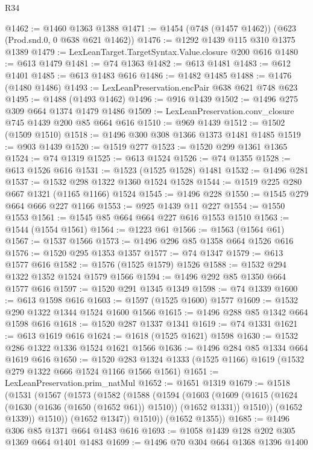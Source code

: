 \begin{lexlean}{R34}
\begin{coremodule}
@1462 := @1460 @1363 @1388
@1471 := @1454 (@748 (@1457 @1462)) (@623 (Prod.snd.{0, 0} @638 @621 @1462))
@1476 := @1292 @1439 @115 @310 @1375 @1389
@1479 := LexLeanTarget.TargetSyntax.Value.closure @200 @616
@1480 := @613 @1479
@1481 := @74 @1363
@1482 := @613 @1481
@1483 := @612 @1401
@1485 := @613 @1483 @616
@1486 := @1482 @1485
@1488 := @1476 (@1480 @1486)
@1493 := LexLeanPreservation.encPair @638 @621 @748 @623
@1495 := @1488 (@1493 @1462)
@1496 := @916 @1439
@1502 := @1496 @275 @309 @664 @1374 @1479 @1486
@1509 := LexLeanPreservation.conv_closure @745 @1439 @200 @85 @664 @616
@1510 := @969 @1439
@1512 := @1502 (@1509 @1510)
@1518 := @1496 @300 @308 @1366 @1373 @1481 @1485
@1519 := @903 @1439
@1520 := @1519 @277
@1523 := @1520 @299 @1361 @1365
@1524 := @74 @1319
@1525 := @613 @1524
@1526 := @74 @1355
@1528 := @613 @1526 @616
@1531 := @1523 (@1525 @1528) @1481
@1532 := @1496 @281
@1537 := @1532 @298 @1322 @1360 @1524 @1528
@1544 := @1519 @225 @280 @667 @1321 (@1165 @1166) @1524
@1545 := @1496 @228
@1550 := @1545 @279 @664 @666 @227 @1166
@1553 := @925 @1439 @11 @227
@1554 := @1550 @1553
@1561 := @1545 @85 @664 @664 @227 @616 @1553 @1510
@1563 := @1544 (@1554 @1561)
@1564 := @1223 @61
@1566 := @1563 (@1564 @61)
@1567 := @1537 @1566
@1573 := @1496 @296 @85 @1358 @664 @1526 @616
@1576 := @1520 @295 @1353 @1357
@1577 := @74 @1347
@1579 := @613 @1577 @616
@1582 := @1576 (@1525 @1579) @1526
@1588 := @1532 @294 @1322 @1352 @1524 @1579 @1566
@1594 := @1496 @292 @85 @1350 @664 @1577 @616
@1597 := @1520 @291 @1345 @1349
@1598 := @74 @1339
@1600 := @613 @1598 @616
@1603 := @1597 (@1525 @1600) @1577
@1609 := @1532 @290 @1322 @1344 @1524 @1600 @1566
@1615 := @1496 @288 @85 @1342 @664 @1598 @616
@1618 := @1520 @287 @1337 @1341
@1619 := @74 @1331
@1621 := @613 @1619 @616
@1624 := @1618 (@1525 @1621) @1598
@1630 := @1532 @286 @1322 @1336 @1524 @1621 @1566
@1636 := @1496 @284 @85 @1334 @664 @1619 @616
@1650 := @1520 @283 @1324 @1333 (@1525 @1166) @1619 (@1532 @279 @1322 @666 @1524 @1166 @1566 @1561)
@1651 := LexLeanPreservation.prim_natMul
@1652 := @1651 @1319
@1679 := @1518
    (@1531
      (@1567
        (@1573
          (@1582
            (@1588
              (@1594
                (@1603
                  (@1609
                    (@1615 (@1624 (@1630 (@1636 (@1650 (@1652 @61)) @1510)) (@1652 @1331)) @1510))
                  (@1652 @1339))
                @1510))
            (@1652 @1347))
          @1510))
      (@1652 @1355))
@1685 := @1496 @306 @85 @1371 @664 @1483 @616
@1693 := @1058 @1439 @128 @202 @305 @1369 @664 @1401 @1483
@1699 := @1496 @70 @304 @664 @1368 @1396 @1400

\end{coremodule}
\end{lexlean}
